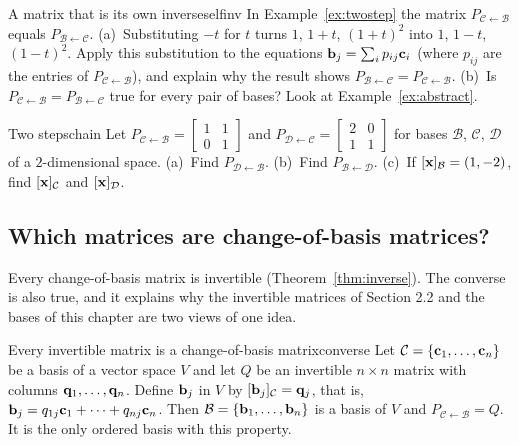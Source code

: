 \documentclass[11pt]{article}
\begin{document}
\begin{think}{A matrix that is its own inverse}{selfinv}
In Example~\ref{ex:twostep} the matrix $P_{\mathcal{C}\leftarrow\mathcal{B}}$ equals $P_{\mathcal{B}\leftarrow\mathcal{C}}$. (a)~Substituting $-t$ for $t$ turns $1$, $1+t$, $(1+t)^2$ into $1$, $1-t$, $(1-t)^2$. Apply this substitution to the equations $\mathbf{b}_j=\sum_i p_{ij}\mathbf{c}_i$ (where $p_{ij}$ are the entries of $P_{\mathcal{C}\leftarrow\mathcal{B}}$), and explain why the result shows $P_{\mathcal{B}\leftarrow\mathcal{C}}=P_{\mathcal{C}\leftarrow\mathcal{B}}$. (b)~Is $P_{\mathcal{C}\leftarrow\mathcal{B}}=P_{\mathcal{B}\leftarrow\mathcal{C}}$ true for every pair of bases? Look at Example~\ref{ex:abstract}.
\end{think}

\begin{kc}{Two steps}{chain}
Let $P_{\mathcal{C}\leftarrow\mathcal{B}}=\begin{bmatrix}1&1\\0&1\end{bmatrix}$ and $P_{\mathcal{D}\leftarrow\mathcal{C}}=\begin{bmatrix}2&0\\1&1\end{bmatrix}$ for bases $\mathcal{B}$, $\mathcal{C}$, $\mathcal{D}$ of a $2$-dimensional space. (a)~Find $P_{\mathcal{D}\leftarrow\mathcal{B}}$. (b)~Find $P_{\mathcal{B}\leftarrow\mathcal{D}}$. (c)~If $[\mathbf{x}]_{\mathcal{B}}=(1,-2)$, find $[\mathbf{x}]_{\mathcal{C}}$ and $[\mathbf{x}]_{\mathcal{D}}$.
\end{kc}

\subsection*{Which matrices are change-of-basis matrices?}

Every change-of-basis matrix is invertible (Theorem~\ref{thm:inverse}). The converse is also true, and it explains why the invertible matrices of Section 2.2 and the bases of this chapter are two views of one idea.

\begin{thm}{Every invertible matrix is a change-of-basis matrix}{converse}
Let $\mathcal{C}=\{\mathbf{c}_1,\dots,\mathbf{c}_n\}$ be a basis of a vector space $V$ and let $Q$ be an invertible $n\times n$ matrix with columns $\mathbf{q}_1,\dots,\mathbf{q}_n$. Define $\mathbf{b}_j$ in $V$ by $[\mathbf{b}_j]_{\mathcal{C}}=\mathbf{q}_j$, that is, $\mathbf{b}_j=q_{1j}\mathbf{c}_1+\cdots+q_{nj}\mathbf{c}_n$. Then $\mathcal{B}=\{\mathbf{b}_1,\dots,\mathbf{b}_n\}$ is a basis of $V$ and $P_{\mathcal{C}\leftarrow\mathcal{B}}=Q$. It is the only ordered basis with this property.
\end{thm}
\end{document}
